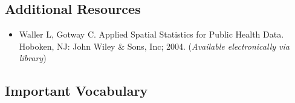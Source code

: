 \documentclass[
]{book}
\providecommand{\tightlist}{%
  \setlength{\itemsep}{0pt}\setlength{\parskip}{0pt}}
\begin{document}
\hypertarget{additional-resources-7}{%
\subsection{Additional Resources}\label{additional-resources-7}}

\begin{itemize}
\tightlist
\item
  Waller L, Gotway C. Applied Spatial Statistics for Public Health Data. Hoboken, NJ: John Wiley \& Sons, Inc; 2004. (\emph{Available electronically via library})
\end{itemize}

\hypertarget{important-vocabulary-7}{%
\subsection{Important Vocabulary}\label{important-vocabulary-7}}

 
  \providecommand{\huxb}[2]{\arrayrulecolor[RGB]{#1}\global\arrayrulewidth=#2pt}
  \providecommand{\huxvb}[2]{\color[RGB]{#1}\vrule width #2pt}
  \providecommand{\huxtpad}[1]{\rule{0pt}{#1}}
  \providecommand{\huxbpad}[1]{\rule[-#1]{0pt}{#1}}
\end{document}
